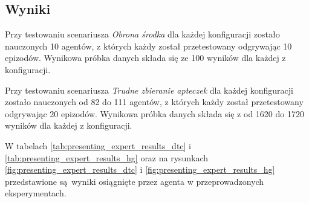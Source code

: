 \documentclass[polish,master,a4paper,oneside]{ppfcmthesis}
\begin{document}
\subsection{Wyniki}

Przy testowaniu scenariusza \textit{Obrona środka} dla każdej konfiguracji zostało nauczonych 10 agentów, z których każdy został przetestowany odgrywając 10 epizodów. Wynikowa próbka danych składa się ze 100 wyników dla każdej z konfiguracji.

Przy testowaniu scenariusza \textit{Trudne zbieranie apteczek} dla każdej konfiguracji zostało nauczonych od 82 do 111 agentów, z których każdy został przetestowany odgrywając 20 epizodów. Wynikowa próbka danych składa się z od 1620 do 1720 wyników dla każdej z konfiguracji.

W tabelach \ref{tab:presenting_expert_results_dtc} i \ref{tab:presenting_expert_results_hg}  oraz na rysunkach \ref{fig:presenting_expert_results_dtc} i \ref{fig:presenting_expert_results_hg}  przedstawione są wyniki osiągnięte przez agenta w przeprowadzonych eksperymentach.

\begin{figure}[H]
\end{figure}
\end{document}
